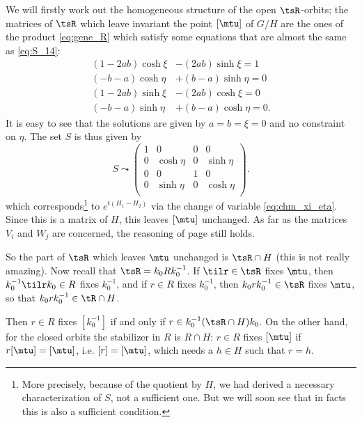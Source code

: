 We will firstly work out the homogeneous structure of the open $\tsR$-orbits; the matrices of $\tsR$ which leave invariant the point $[\mtu]$ of $G/H$ are the ones of the product \eqref{eq:gene_R} which satisfy some equations that are almost the same as \eqref{eq:S_14}:
\begin{subequations}
	\begin{align}
		(1-2ab)\cosh\xi & -(2ab)\sinh\xi=1   \\
		(-b-a)\cosh\eta & +(b-a)\sinh\eta=0  \\
		(1-2ab)\sinh\xi & -(2ab)\cosh\xi=0   \\
		(-b-a)\sinh\eta & +(b-a)\cosh\eta=0.
	\end{align}
\end{subequations}
It is easy to see that the solutions are given by $a=b=\xi=0$ and no constraint on $\eta$. The set $S$ is thus given by
\begin{equation}
	S\leadsto
	\begin{pmatrix}
		1 & 0         & 0 & 0         \\
		0 & \cosh\eta & 0 & \sinh\eta \\
		0 & 0         & 1 & 0         \\
		0 & \sinh\eta & 0 & \cosh\eta \\
	\end{pmatrix}.
\end{equation}
which corresponds\footnote{More precisely, because of the quotient by $H$, we had derived a necessary characterization of $S$, not a sufficient one. But we will soon see that in facts this is also a sufficient condition.} to $ e^{t(H_{1}-H_{2})}$ via the change of variable \eqref{eq:chm_xi_eta}. Since this is a matrix of $H$, this leaves $[\mtu]$ unchanged. As far as the matrices $V_i$ and $W_j$ are concerned, the reasoning of page \pageref{pg:influence_V_W} still holds.

So the part of $\tsR$ which leaves $\mtu$ unchanged is $\tsR\cap H$ (this is not really amazing). Now recall that $\tsR=k_0Rk_0^{-1}$. If $\tilr\in\tsR$ fixes $\mtu$, then $k_0^{-1}\tilr k_0\in R$ fixes $k_0^{-1}$, and if $r\in R$ fixes $k_0^{-1}$, then $k_0rk_0^{-1}\in\tsR$ fixes $\mtu$, so that $k_0rk_0^{-1}\in\tR\cap H$.

Then $r\in R$ fixes $[k_0^{-1}]$ if and only if $r\in k_0^{-1}(\tsR\cap H)k_0$. On the other hand, for the closed orbits the stabilizer in $R$ is $R\cap H$: $r\in R$ fixes $[\mtu]$ if $r[\mtu]=[\mtu]$, i.e. $[r]=[\mtu]$, which needs a $h\in H$ such that $r=h$.

